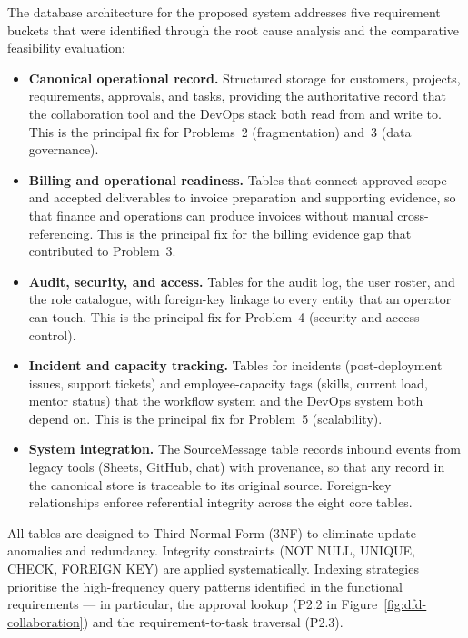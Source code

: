 \documentclass[12pt,a4paper]{report}
\begin{document}
The database architecture for the proposed system addresses five requirement
buckets that were identified through the root cause analysis and the comparative
feasibility evaluation:

\begin{itemize}[leftmargin=1.6em]
    \item \textbf{Canonical operational record.} Structured storage for
          customers, projects, requirements, approvals, and tasks, providing the
          authoritative record that the collaboration tool and the DevOps
          stack both read from and write to. This is the principal fix for
          Problems~2 (fragmentation) and~3 (data governance).
    \item \textbf{Billing and operational readiness.} Tables that connect
          approved scope and accepted deliverables to invoice preparation
          and supporting evidence, so that finance and operations can
          produce invoices without manual cross-referencing. This is the
          principal fix for the billing evidence gap that contributed to
          Problem~3.
    \item \textbf{Audit, security, and access.} Tables for the audit log, the
          user roster, and the role catalogue, with foreign-key linkage to
          every entity that an operator can touch. This is the principal
          fix for Problem~4 (security and access control).
    \item \textbf{Incident and capacity tracking.} Tables for incidents
          (post-deployment issues, support tickets) and employee-capacity
          tags (skills, current load, mentor status) that the workflow
          system and the DevOps system both depend on. This is the
          principal fix for Problem~5 (scalability).
    \item \textbf{System integration.} The SourceMessage table records
          inbound events from legacy tools (Sheets, GitHub, chat) with
          provenance, so that any record in the canonical store is
          traceable to its original source. Foreign-key relationships
          enforce referential integrity across the eight core tables.
\end{itemize}

All tables are designed to Third Normal Form (3NF) to eliminate update anomalies
and redundancy. Integrity constraints (NOT NULL, UNIQUE, CHECK, FOREIGN KEY) are
applied systematically. Indexing strategies prioritise the high-frequency query
patterns identified in the functional requirements --- in particular, the
approval lookup (P2.2 in Figure~\ref{fig:dfd-collaboration}) and the
requirement-to-task traversal (P2.3).
\end{document}
